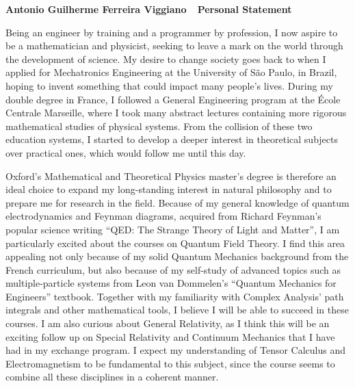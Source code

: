 \documentclass[10pt]{article}
\def\firstname{Antonio Guilherme }
\def\familyname{Ferreira Viggiano}
\def\subj{Personal Statement}
\def\FileTitle{\firstname\familyname~\textemdash~\subj}
\begin{document}
\sffamily %

{\bfseries \FileTitle}


Being an engineer by training and a programmer by profession, I now aspire to be a mathematician and physicist, seeking to leave a mark on the world through the development of science. My desire to change society goes back to when I applied for Mechatronics Engineering at the University of São Paulo, in Brazil, hoping to invent something that could impact many people's lives. During my double degree in France, I followed a General Engineering program at the École Centrale Marseille, where I took many abstract lectures containing more rigorous mathematical studies of physical systems. From the collision of these two education systems, I started to develop a deeper interest in theoretical subjects over practical ones, which would follow me until this day.

Oxford's Mathematical and Theoretical Physics master's degree is therefore an ideal choice to expand my long-standing interest in natural philosophy and to prepare me for research in the field. Because of my general knowledge of quantum electrodynamics and Feynman diagrams, acquired from Richard Feynman's popular science writing ``QED: The Strange Theory of Light and Matter'', I am particularly excited about the courses on Quantum Field Theory. I find this area appealing not only because of my solid Quantum Mechanics background from the French curriculum, but also because of my self-study of advanced topics such as multiple-particle systems from Leon van Dommelen's ``Quantum Mechanics for Engineers'' textbook. Together with my familiarity with Complex Analysis' path integrals and other mathematical tools, I believe I will be able to succeed in these courses. I am also curious about General Relativity, as I think this will be an exciting follow up on Special Relativity and Continuum Mechanics that I have had in my exchange program. I expect my understanding of Tensor Calculus and Electromagnetism to be fundamental to this subject, since the course seems to combine all these disciplines in a coherent manner.                
\end{document}
